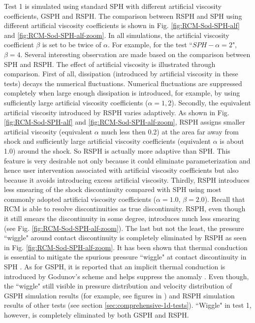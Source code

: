 \documentclass[review]{elsarticle}
\begin{document}
Test 1 is simulated using standard SPH with different artificial viscosity coefficients, GSPH and RSPH. The comparison between RSPH and SPH using different artificial viscosity coefficients is shown in Fig. \ref{fig:RCM-Sod-SPH-alf} and \ref{fig:RCM-Sod-SPH-alf-zoom}. In all simulations, the artificial viscosity coefficient $\beta$ is set to be twice of $\alpha$. For example, for the test ``$SPH-\alpha=2$", $\beta=4$. Several interesting observation are made based on the comparison between SPH and RSPH. The effect of artificial viscosity is illustrated through comparison.
First of all, dissipation (introduced by artificial viscosity in these tests) decays the numerical fluctuations. Numerical fluctuations are suppressed completely when large enough dissipation is introduced, for example, by using sufficiently large artificial viscosity coefficients ($\alpha=1,2$).
Secondly, the equivalent artificial viscosity introduced by RSPH varies adaptively.
As shown in Fig. \ref{fig:RCM-Sod-SPH-alf} and \ref{fig:RCM-Sod-SPH-alf-zoom}, RSPH assigns smaller artificial viscosity  (equivalent $\alpha$ much less then 0.2) at the area far away from shock and sufficiently large artificial viscosity coefficients (equivalent $\alpha$ is about 1.0) around the shock. So RSPH is actually more adaptive than SPH. This feature is very desirable not only because it could eliminate parameterization and hence user intervention associated with artificial viscosity coefficients but also because it avoids introducing excess artificial viscosity.
Thirdly, RSPH introduces less smearing of the shock discontinuity compared with SPH using most commonly adopted artificial viscosity coefficients ($\alpha=1.0$, $\beta=2.0$). Recall that RCM is able to resolve discontinuities as true discontinuity. RSPH, even though it still smears the discontinuity in some degree, introduces much less smearing (see Fig. \ref{fig:RCM-Sod-SPH-alf-zoom}).
The last but not the least, the pressure ``wiggle" around contact discontinuity is completely eliminated by RSPH as seen in Fig. \ref{fig:RCM-Sod-SPH-alf-zoom}. It has been shown that thermal conduction is essential to mitigate the spurious pressure ``wiggle" at contact discontinuity in SPH \citep{monaghan1997sph, sigalotti2006shock, price2008modelling, price2012smoothed}. As for GSPH, it is reported that an implicit thermal conduction is introduced by Godunov's scheme and helps suppress the anomaly \citep{puri2014approximate}. Even though, the ``wiggle" still visible in pressure distribution and velocity distribution of GSPH simulation results (for example, see figures in \citep{puri2014comparison}) and RSPH simulation results of other tests (see section \ref{sec:comprehensive-1d-tests}). ``Wiggle" in test 1, however, is completely eliminated by both GSPH and RSPH.
\end{document}
